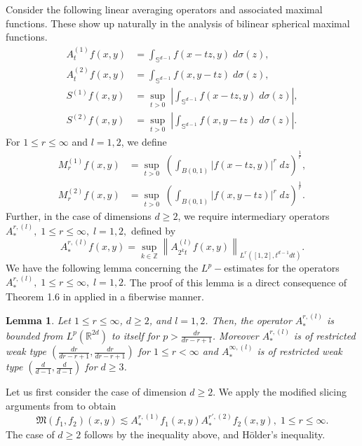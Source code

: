 \documentclass[a4paper,reqno]{amsart}
\newtheorem{lemma}[theorem]{Lemma}
\theoremstyle{definition}
\theoremstyle{remark}
\numberwithin{equation}{section}
\newcommand{\R}{{\mathbb {R}}}
\newcommand{\Z}{{\mathbb Z}}
\newcommand{\Sp}{{\mathbb S}}
\begin{document}
	Consider the following linear averaging operators and associated maximal functions. These show up naturally in the analysis of bilinear spherical maximal functions. 
	\begin{align*}
		A_t^{(1)}f(x,y)&=\int_{\Sp^{d-1}}f(x-tz,y)\;d\sigma(z),\\
		A_t^{(2)}f(x,y)&=\int_{\Sp^{d-1}}f(x,y-tz)\;d\sigma(z),\\
		S^{(1)}f(x,y)&=\sup_{t>0}\;\left|\int_{\Sp^{d-1}}f(x-tz,y)\;d\sigma(z)\right|,\\
		S^{(2)}f(x,y)&=\sup_{t>0}\;\left|\int_{\Sp^{d-1}}f(x,y-tz)\;d\sigma(z)\right|.
	\end{align*}
	For $1\leq r\leq\infty$ and $l=1,2$, we define
	\begin{align*}
		M^{(1)}_rf(x,y)&=\sup_{t>0}\;\left(\int_{B(0,1)}|f(x-tz,y)|^r\;dz\right)^\frac{1}{r},\\
		M^{(2)}_rf(x,y)&=\sup_{t>0}\;\left(\int_{B(0,1)}|f(x,y-tz)|^r\;dz\right)^\frac{1}{r}.
	\end{align*}
	Further, in the case of dimensions $d\geq 2$, we require intermediary operators $A^{r,(l)}_*,\;1\leq r\leq\infty,\;l=1,2,$ defined by
	\[A^{r,(l)}_*f(x,y)=\sup_{k\in\Z}\left\|A_{2^kt}^{(l)}f(x,y)\right\|_{L^r([1,2],t^{d-1}dt)}.\]
	We have the following lemma concerning the $L^p-$estimates for the operators $A^{r,(l)}_*,\;1\leq r\leq\infty,\;l=1,2.$ The proof of this lemma is a direct consequence of Theorem 1.6 in \cite{BCSS1} applied in a fiberwise manner.
	\begin{lemma}\label{Arlinear}
		Let $1\leq r\leq\infty$, $d\geq2$, and $l=1,2$. Then, the operator $A^{r,(l)}_*$ is bounded from  $L^p(\R^{2d})$ to itself for $p>\frac{dr}{dr-r+1}$. Moreover $A^{r,(l)}_*$ is of restricted weak type $\left(\frac{dr}{dr-r+1},\frac{dr}{dr-r+1}\right)$ for $1\leq r<\infty$ and $A^{\infty,(l)}_*$ is of restricted weak type $\left(\frac{d}{d-1},\frac{d}{d-1}\right)$ for $d\geq3$.
	\end{lemma}
	
	Let us first consider the case of dimension $d\geq 2.$ We apply the modified slicing arguments from \cite{BCSS1} to obtain
	\[\mathfrak{M}(f_1,f_2)(x,y)\lesssim A^{r,(1)}_*f_1(x,y)A^{r',(2)}_*f_2(x,y),\;1\leq r\leq \infty.\]
	The case of $d\geq2$ follows by the  inequality above,  and H\"older's inequality.
	
\end{document}
